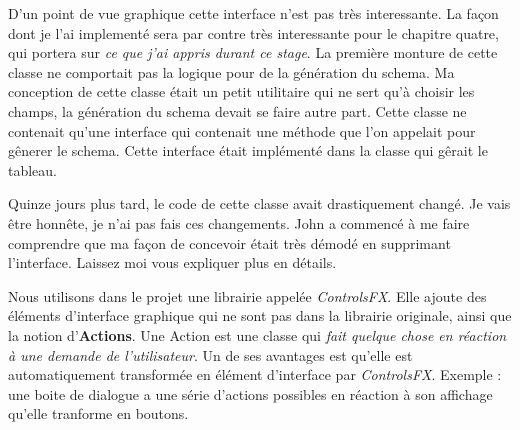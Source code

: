 
D'un point de vue graphique cette interface n'est pas très interessante. La façon dont je l'ai implementé sera par contre très interessante pour le chapitre quatre, qui portera sur \textit{ce que j'ai appris durant ce stage}. La première monture de cette classe ne comportait pas la logique pour de la génération du schema. Ma conception de cette classe était un petit utilitaire qui ne sert qu'à choisir les champs, la génération du schema devait se faire autre part. Cette classe ne contenait qu'une interface qui contenait une méthode que l'on appelait pour gênerer le schema. Cette interface était implémenté dans la classe qui gêrait le tableau.


Quinze jours plus tard, le code de cette classe avait drastiquement changé. Je vais être honnête, je n'ai pas fais ces changements. John a commencé à me faire comprendre que ma façon de concevoir était très démodé en supprimant l'interface. Laissez moi vous expliquer plus en détails.

Nous utilisons dans le projet une librairie appelée \textit{ControlsFX}. Elle ajoute des éléments d'interface graphique qui ne sont pas dans la librairie originale, ainsi que la notion d'\textbf{Actions}. Une Action est une classe qui \textit{fait quelque chose en réaction à une demande de l'utilisateur}.  Un de ses avantages est qu'elle est automatiquement transformée en élément d'interface par \textit{ControlsFX}. Exemple : une boite de dialogue a une série d'actions possibles en réaction à son affichage qu'elle tranforme en boutons.